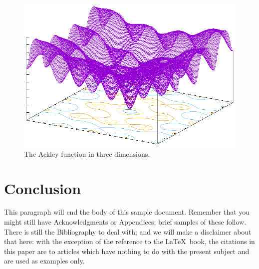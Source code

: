 \begin{figure}
  \includegraphics[width=\columnwidth]{../img/ackley}
  \caption{The Ackley function in three dimensions.}\label{fig:ackley}
\end{figure}


\section{Conclusion}
This paragraph will end the body of this sample document.
Remember that you might still have Acknowledgments or
Appendices; brief samples of these
follow.  There is still the Bibliography to deal with; and
we will make a disclaimer about that here: with the exception
of the reference to the \LaTeX\ book, the citations in
this paper are to articles which have nothing to
do with the present subject and are used as
examples only.


